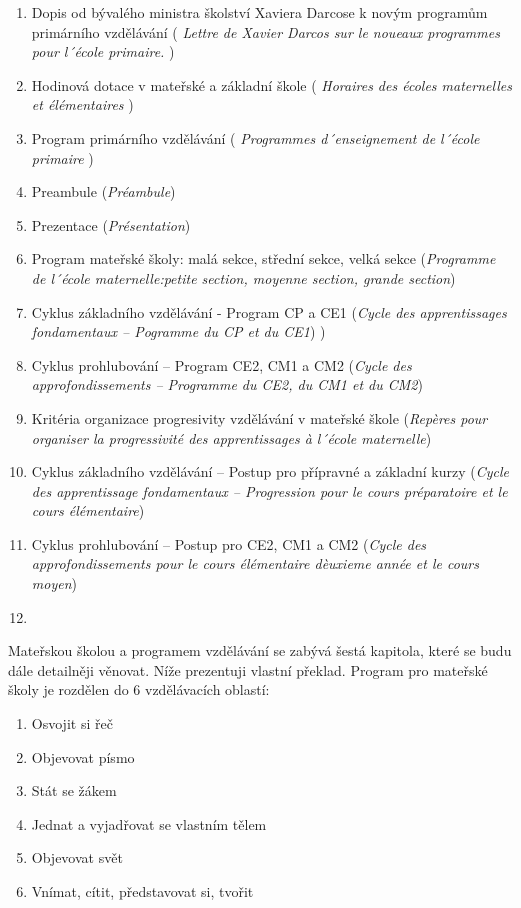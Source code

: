 	\begin{enumerate}[I]	%
		\item 
		Dopis od bývalého ministra školství Xaviera Darcose k novým programům primárního vzdělávání (
		\textit{Lettre de Xavier Darcos sur le noueaux programmes pour l´école primaire.}
		)
		\item 
		Hodinová dotace v mateřské a základní škole (
		\textit{Horaires des écoles maternelles et élémentaires}
		)
		\item
		Program primárního vzdělávání (
		\textit{Programmes d´enseignement  de l´école primaire}
		)
		\item 
		Preambule (\textit{Préambule})
		\item 
		Prezentace (\textit{Présentation})
		\item 
		Program mateřské školy: malá sekce, střední sekce, velká sekce 
		(\textit{Programme de l´école maternelle:petite section, moyenne section, grande section})
		\item 
		Cyklus základního vzdělávání - Program CP a CE1 (\textit{Cycle des apprentissages fondamentaux – Pogramme du CP et du CE1})		)
		\item 
		Cyklus prohlubování – Program CE2, CM1 a CM2 (\textit{Cycle des approfondissements – Programme du CE2, du CM1 et du CM2})
		\item 
		Kritéria organizace progresivity vzdělávání v mateřské škole (\textit{Repères pour organiser la progressivité des apprentissages à l´école maternelle})
		\item 
		Cyklus základního vzdělávání – Postup pro přípravné a základní kurzy (\textit{Cycle des apprentissage fondamentaux – Progression pour le cours préparatoire et le cours élémentaire})
		\item 
		Cyklus prohlubování – Postup pro CE2, CM1 a CM2 (\textit{Cycle des approfondissements pour le cours élémentaire dèuxieme année et le cours moyen})
		\item
	\end{enumerate}


	Mateřskou školou a programem vzdělávání se zabývá šestá kapitola, které se budu dále detailněji věnovat. Níže prezentuji vlastní překlad.
	Program pro mateřské školy je rozdělen do 6 vzdělávacích oblastí:

	\begin{enumerate}[1]
		\item Osvojit si řeč 
		\item Objevovat písmo 
		\item Stát se žákem 
		\item Jednat a vyjadřovat se vlastním tělem 
		\item Objevovat svět
		\item Vnímat, cítit, představovat si, tvořit
	\end{enumerate}

